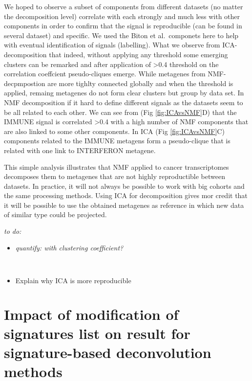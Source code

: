 \documentclass[12pt,]{book}
\theoremstyle{definition}
\theoremstyle{definition}
\theoremstyle{definition}
\theoremstyle{remark}
\begin{document}
We hoped to observe a subset of components from different datasets (no
matter the decomposition level) correlate with each strongly and much
less with other components in order to confirm that the signal is
reproducible (can be found in several dataset) and specific. We used the
Biton et al.~componets here to help with eventual identification of
signals (labelling). What we observe from ICA-decomposition that indeed,
without applying any threshold some emerging clusters can be remarked
and after application of \textgreater{}0.4 threshold on the correlation
coeffcient pseudo-cliques emerge. While metagenes from NMF-decpmpostion
are more tighlty connected globally and when the threshold is applied,
remaing metagenes do not form clear clusters but group by data set. In
NMF decomposition if it hard to define different signals as the datasets
seem to be all related to each other. We can see from (Fig
\ref{fig:ICAvsNMF}D) that the IMMUNE signal is correlated
\textgreater{}0.4 with a high number of NMF components that are also
linked to some other components. In ICA (Fig \ref{fig:ICAvsNMF}C)
components related to the IMMUNE metagens form a pseudo-clique that is
related with one link to INTERFERON metagene.

This simple analysis illustrates that NMF applied to cancer
transcriptomes decomposes them to metagenes that are not highly
reproductible between datasets. In practice, it will not always be
possible to work with big cohorts and the same processing methods. Using
ICA for decomposition gives mor credit that it will be possible to use
the obtained metagenes as reference in which new data of similar type
could be projected.

\emph{to do:}

\begin{itemize}
\item
  \emph{quantify: with clustering coefficient?}

  ​
\item
  Explain why ICA is more reproducible
\end{itemize}

\hypertarget{impact-of-modification-of-signatures-list-on-result-for-signature-based-deconvolution-methods}{%
\section{Impact of modification of signatures list on result for
signature-based deconvolution
methods}\label{impact-of-modification-of-signatures-list-on-result-for-signature-based-deconvolution-methods}}
\end{document}
